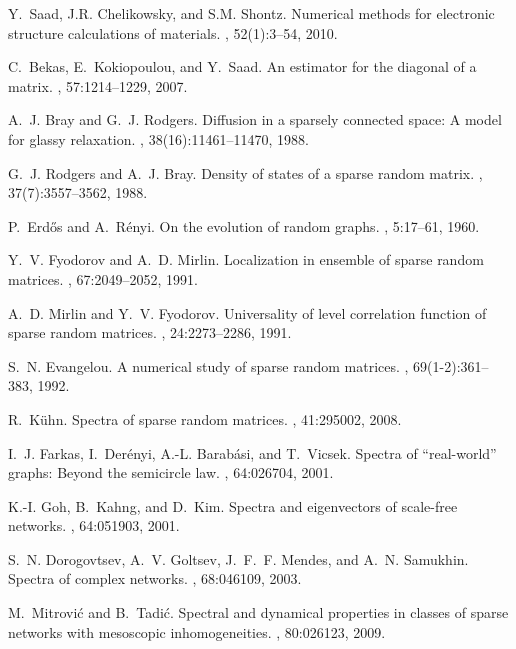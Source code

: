 \documentclass[twoside]{article}
\begin{document}
\begin{small}
\begin{thebibliography}{100}
Y.~Saad, J.R. Chelikowsky, and S.M. Shontz.
\newblock Numerical methods for electronic structure calculations of materials.
, 52(1):3--54, 2010.

C.~Bekas, E.~Kokiopoulou, and Y.~Saad.
\newblock An estimator for the diagonal of a matrix.
, 57:1214--1229, 2007.

A.~J. Bray and G.~J. Rodgers.
\newblock Diffusion in a sparsely connected space: A model for glassy
  relaxation.
, 38(16):11461--11470, 1988.

G.~J. Rodgers and A.~J. Bray.
\newblock Density of states of a sparse random matrix.
, 37(7):3557--3562, 1988.

P.~Erd\H{o}s and A.~R\'{e}nyi.
\newblock On the evolution of random graphs.
, 5:17--61, 1960.

Y.~V. Fyodorov and A.~D. Mirlin.
\newblock Localization in ensemble of sparse random matrices.
, 67:2049--2052, 1991.

A.~D. Mirlin and Y.~V. Fyodorov.
\newblock Universality of level correlation function of sparse random matrices.
, 24:2273--2286, 1991.

S.~N. Evangelou.
\newblock A numerical study of sparse random matrices.
, 69(1-2):361--383, 1992.

R.~K\"{u}hn.
\newblock Spectra of sparse random matrices.
, 41:295002, 2008.

I.~J. Farkas, I.~Der\'{e}nyi, A.-L. Barab\'{a}si, and T.~Vicsek.
\newblock Spectra of ``real-world'' graphs: Beyond the semicircle law.
, 64:026704, 2001.

K.-I. Goh, B.~Kahng, and D.~Kim.
\newblock Spectra and eigenvectors of scale-free networks.
, 64:051903, 2001.

S.~N. Dorogovtsev, A.~V. Goltsev, J.~F.~F. Mendes, and A.~N. Samukhin.
\newblock Spectra of complex networks.
, 68:046109, 2003.

M.~Mitrovi\'{c} and B.~Tadi\'{c}.
\newblock Spectral and dynamical properties in classes of sparse networks with
  mesoscopic inhomogeneities.
, 80:026123, 2009.


\end{thebibliography}
\end{small}
\end{document}

